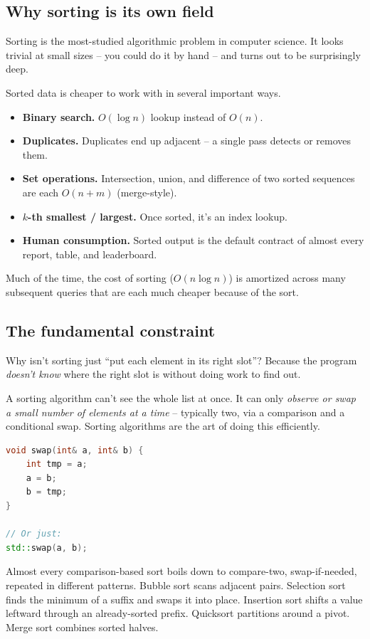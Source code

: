 \documentclass[11pt]{article}
\begin{document}
\subsection{Why sorting is its own field}

Sorting is the most-studied algorithmic problem in computer science.
It looks trivial at small sizes -- you could do it by hand -- and
turns out to be surprisingly deep.

\begin{ideabox}
Sorted data is cheaper to work with in several important ways.
\begin{itemize}[leftmargin=*]
  \item \textbf{Binary search.} $O(\log n)$ lookup instead of $O(n)$.
  \item \textbf{Duplicates.} Duplicates end up adjacent -- a single
        pass detects or removes them.
  \item \textbf{Set operations.} Intersection, union, and difference
        of two sorted sequences are each $O(n + m)$ (merge-style).
  \item \textbf{$k$-th smallest / largest.} Once sorted, it's an
        index lookup.
  \item \textbf{Human consumption.} Sorted output is the default
        contract of almost every report, table, and leaderboard.
\end{itemize}
Much of the time, the cost of sorting ($O(n \log n)$) is amortized
across many subsequent queries that are each much cheaper because
of the sort.
\end{ideabox}

\subsection{The fundamental constraint}

Why isn't sorting just ``put each element in its right slot''? Because
the program \emph{doesn't know} where the right slot is without
doing work to find out.

\begin{defnbox}
A sorting algorithm can't see the whole list at once. It can only
\emph{observe or swap a small number of elements at a time} --
typically two, via a comparison and a conditional swap. Sorting
algorithms are the art of doing this efficiently.
\end{defnbox}

\begin{examplebox}
\begin{lstlisting}[basicstyle=\ttfamily\small,frame=single,language=C++]
void swap(int& a, int& b) {
    int tmp = a;
    a = b;
    b = tmp;
}

// Or just:
std::swap(a, b);
\end{lstlisting}
Almost every comparison-based sort boils down to compare-two,
swap-if-needed, repeated in different patterns. Bubble sort scans
adjacent pairs. Selection sort finds the minimum of a suffix and
swaps it into place. Insertion sort shifts a value leftward through
an already-sorted prefix. Quicksort partitions around a pivot.
Merge sort combines sorted halves.
\end{examplebox}
\end{document}
